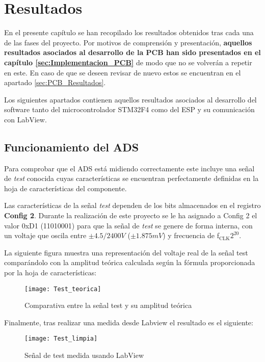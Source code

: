 \chapter{Resultados\label{sec:Resultados}}

En el presente capítulo se han recopilado los resultados obtenidos tras cada una de las fases del proyecto. Por motivos de comprensión y presentación, \textbf{aquellos resultados asociados al desarrollo de la \acrshort{PCB} han sido presentados en el capítulo \ref{sec:Implementacion_PCB}} de modo que no se volverán a repetir en este. En caso de que se deseen revisar de nuevo estos se encuentran en el apartado \ref{sec:PCB_Resultados}.

Los siguientes apartados contienen aquellos resultados asociados al desarrollo del software tanto del microcontrolador STM32F4 como del ESP y su comunicación con LabView.

\section{Funcionamiento del ADS\label{Resultados_ADS}}

Para comprobar que el ADS está midiendo correctamente este incluye una señal de \textit{test} conocida cuyas características se encuentran perfectamente definidas en la hoja de características del componente.

Las características de la señal \textit{test} dependen de los bits almacenados en el registro \textbf{Config 2}. Durante la realización de este proyecto se le ha asignado a Config 2 el valor 0xD1 (11010001) para que la señal de \textit{test} se genere de forma interna, con un voltaje que oscila entre $\pm4.5/2400V$ ($\pm1.875mV$) y frecuencia de f$_\text{CLK}$\/$2^{20}$.

La siguiente figura muestra una representación del voltaje real de la señal test comparándolo con la amplitud teórica calculada según la fórmula proporcionada por la hoja de características:

\begin{figure} [H]
    \centering
    \texttt{[image: Test\_teorica]}
    \caption{Comparativa entre la señal test y su amplitud teórica}
    \label{fig:tes_teorica}
\end{figure}

Finalmente, tras realizar una medida desde Labview el resultado es el siguiente:

\begin{figure} [H]
    \centering
    \texttt{[image: Test\_limpia]}
    \caption{Señal de test medida usando LabView}
    \label{fig:Test_limpia}
\end{figure}

